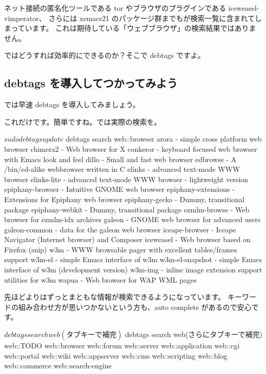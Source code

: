 \documentclass[mingoth,a4paper]{jsarticle}
\begin{document}
ネット接続の匿名化ツールである tor やブラウザのプラグインである iceweasel-vimperator、
さらには xemacs21 のパッケージ群までもが検索一覧に含まれてしまっています。
これは期待している「ウェブブラウザ」の検索結果ではありません。

ではどうすれば効率的にできるのか？そこで debtags ですよ。

\subsection{debtags を導入してつかってみよう}
では早速 debtags を導入してみましょう。
これだけです。簡単ですね。では実際の検索を。

\begin{commandline}
$ sudo debtags update
$ debtags search web::browser
arora - simple cross platform web browser
chimera2 - Web browser for X
conkeror - keyboard focused web browser with Emacs look and feel
dillo - Small and fast web browser
edbrowse - A /bin/ed-alike webbrowser written in C
elinks - advanced text-mode WWW browser
elinks-lite - advanced text-mode WWW browser - lightweight version
epiphany-browser - Intuitive GNOME web browser
epiphany-extensions - Extensions for Epiphany web browser
epiphany-gecko - Dummy, transitional package
epiphany-webkit - Dummy, transitional package
ezmlm-browse - Web browser for ezmlm-idx archives
galeon - GNOME web browser for advanced users
galeon-common - data for the galeon web browser
iceape-browser - Iceape Navigator (Internet browser) and Composer
iceweasel - Web browser based on Firefox
(snip)
w3m - WWW browsable pager with excellent tables/frames support
w3m-el - simple Emacs interface of w3m
w3m-el-snapshot - simple Emacs interface of w3m (development version)
w3m-img - inline image extension support utilities for w3m
wapua - Web browser for WAP WML pages
\end{commandline}

先ほどよりはずっとまともな情報が検索できるようになっています。
キーワードの組み合わせ方が思いつかないという方も、auto complete があるので安心です。

\begin{commandline}
$ debtags search web(タブキーで補完)
$ debtags search web\:\:(さらにタブキーで補完)
web::TODO           web::browser        web::forum          web::server
web::application    web::cgi            web::portal         web::wiki
web::appserver      web::cms            web::scripting
web::blog           web::commerce       web::search-engine
\end{commandline}
\end{document}
